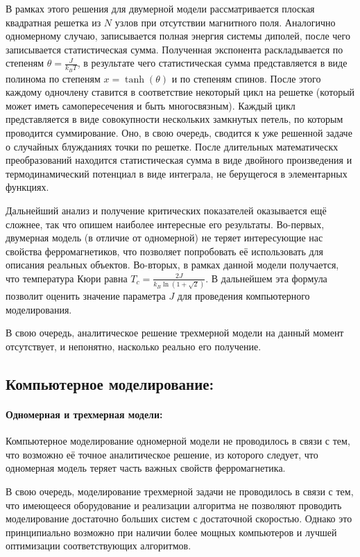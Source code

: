 \documentclass[oneside,final,14pt]{extarticle}
\begin{document}
	В рамках этого решения для двумерной модели рассматривается плоская квадратная решетка из $N$ узлов при отсутствии магнитного поля. Аналогично одномерному случаю, записывается полная энергия системы диполей, после чего записывается статистическая сумма. Полученная экспонента раскладывается по степеням $\theta = \frac{J}{k_{B}T}$, в результате чего статистическая сумма представляется в виде полинома по степеням $x=\tanh(\theta)$ и по степеням спинов. После этого каждому одночлену ставится в соответствие некоторый цикл на решетке (который может иметь самопересечения и быть многосвязным). Каждый цикл представляется в виде совокупности нескольких замкнутых петель, по которым проводится суммирование. Оно, в свою очередь, сводится к уже решенной задаче о случайных блужданиях точки по решетке. После длительных математическх преобразований находится статистическая сумма в виде двойного произведения и термодинамический потенциал в виде интеграла, не берущегося в элементарных функциях. 

	Дальнейший анализ и получение критических показателей оказывается ещё сложнее, так что опишем наиболее интересные его результаты. Во-первых, двумерная модель (в отличие от одномерной) не теряет интересующие нас свойства ферромагнетиков, что позволяет попробовать её использовать для описания реальных объектов. Во-вторых, в рамках данной модели получается, что температура Кюри равна $T_{c}=\frac{2J}{k_{B}\ln(1+\sqrt{2})}$. В дальнейшем эта формула позволит оценить значение параметра $J$ для проведения компьютерного моделирования. 

	В свою очередь, аналитическое решение трехмерной модели на данный момент отсутствует, и непонятно, насколько реально его получение. 
	\subsection{Компьютерное моделирование:}
	\paragraph{Одномерная и трехмерная модели:}
	Компьютерное моделирование одномерной модели не проводилось в связи с тем, что возможно её точное аналитическое решение, из которого следует, что одномерная модель теряет часть важных свойств ферромагнетика. 

	В свою очередь, моделирование трехмерной задачи не проводилось в связи с тем, что имеющееся оборудование и реализации алгоритма не позволяют проводить моделирование достаточно больших систем с достаточной скоростью. Однако это принципиально возможно при наличии более мощных компьютеров и лучшей оптимизации соответствующих алгоритмов. 
\end{document}
